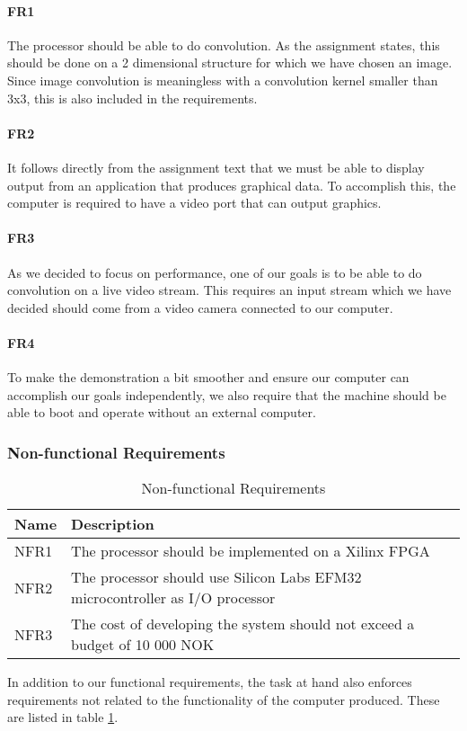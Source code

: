 \paragraph{FR1}
The processor should be able to do convolution.
As the assignment states, this should be done on a 2 dimensional structure for which we have chosen an image.
Since image convolution is meaningless with a convolution kernel smaller than 3x3,
this is also included in the requirements.

\paragraph{FR2}
It follows directly from the assignment text that we must be able to display output from an application that produces graphical data.
To accomplish this, the computer is required to have a video port that can output graphics.

\paragraph{FR3}
As we decided to focus on performance, one of our goals is to be able to do convolution on a live video stream.
This requires an input stream which we have decided should come from a video camera connected to our computer.

\paragraph{FR4}
To make the demonstration a bit smoother and ensure our computer can accomplish our goals independently, we also require that the machine should be able to boot and operate without an external computer.

\subsubsection{Non-functional Requirements}
\begin{table}[h]
    \centering
    \begin{tabular}{lp{12cm}l}
        Name & Description \\
        \hline
        NFR1 &
            The processor should be implemented on a Xilinx FPGA \\
        NFR2 &
            The processor should use Silicon Labs EFM32 microcontroller as I/O processor \\
        NFR3 &
            The cost of developing the system should not exceed a budget of 10 000 NOK \\
    \end{tabular}
    \caption{Non-functional Requirements}
    \label{tab:NonFunctionalRequirements}
\end{table}

In addition to our functional requirements, the task at hand also enforces requirements not related to the functionality of the computer produced. These are listed in table \ref{tab:NonFunctionalRequirements}.

